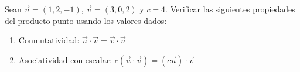 Sean $\vec{u} = (1, 2, -1)$, $\vec{v} = (3, 0, 2)$ y $c = 4$. Verificar las siguientes propiedades del producto punto usando los valores dados:
\begin{enumerate}
    \item Conmutatividad: $\vec{u} \cdot \vec{v} = \vec{v} \cdot \vec{u}$
    \item Asociatividad con escalar: $c(\vec{u} \cdot \vec{v}) = (c\vec{u}) \cdot \vec{v}$
\end{enumerate}